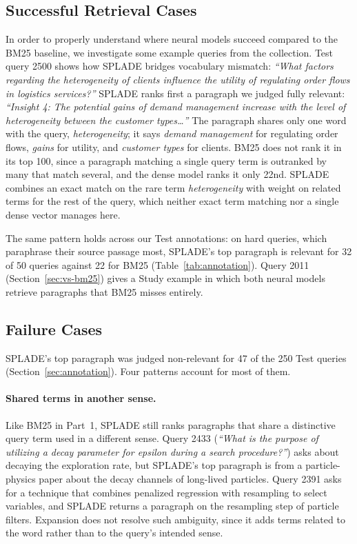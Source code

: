 \documentclass[sigconf,nonacm]{acmart}
\begin{document}
\subsection{Successful Retrieval Cases}
\label{sec:successes}
In order to properly understand where neural models succeed compared to the BM25 
baseline, we investigate some example queries from the collection. Test query 
2500 shows how SPLADE bridges vocabulary mismatch: \textit{``What factors 
regarding the heterogeneity of clients influence the utility of regulating 
order flows in logistics services?''} SPLADE ranks first a paragraph we judged 
fully relevant: \textit{``Insight 4: The potential gains of demand management 
increase with the level of heterogeneity between the customer types\ldots''} The 
paragraph shares only one word with the query, \textit{heterogeneity}; it says 
\textit{demand management} for regulating order flows, \textit{gains} for utility, 
and \textit{customer types} for clients. BM25 does not rank it in its top 100, 
since a paragraph matching a single query term is outranked by many that match 
several, and the dense model ranks it only 22nd. SPLADE combines an exact match 
on the rare term \textit{heterogeneity} with weight on related terms for the rest 
of the query, which neither exact term matching nor a single dense vector manages 
here.

The same pattern holds across our Test annotations: on hard queries, which paraphrase 
their source passage most, SPLADE's top paragraph is relevant for 32 of 50 queries 
against 22 for BM25 (Table~\ref{tab:annotation}). Query 2011 (Section~\ref{sec:vs-bm25}) 
gives a Study example in which both neural models retrieve paragraphs that BM25 
misses entirely.

\subsection{Failure Cases}
\label{sec:failures}
SPLADE's top paragraph was judged non-relevant for 47 of the 250 Test queries 
(Section~\ref{sec:annotation}). Four patterns account for most of them.

\paragraph{Shared terms in another sense.} Like BM25 in Part~1, SPLADE still ranks 
paragraphs that share a distinctive query term used in a different sense. Query 2433 
(\textit{``What is the purpose of utilizing a decay parameter for epsilon during a 
search procedure?''}) asks about decaying the exploration rate, but SPLADE's top 
paragraph is from a particle-physics paper about the decay channels of long-lived 
particles. Query 2391 asks for a technique that combines penalized regression with 
resampling to select variables, and SPLADE returns a paragraph on the resampling 
step of particle filters. Expansion does not resolve such ambiguity, since it adds 
terms related to the word rather than to the query's intended sense.
\end{document}
